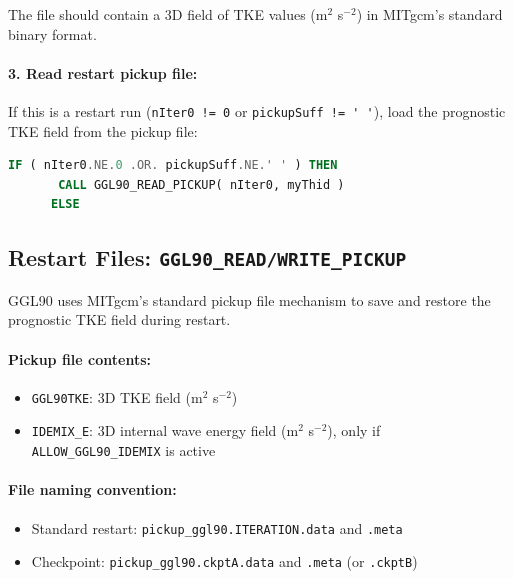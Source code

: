 \documentclass[12pt,letterpaper]{article}
\begin{document}
The file should contain a 3D field of TKE values (m$^2$ s$^{-2}$) in MITgcm's standard binary format.

\paragraph{3. Read restart pickup file:}

If this is a restart run (\verb|nIter0 != 0| or \verb|pickupSuff != ' '|), load the prognostic TKE field from the pickup file:

\begin{lstlisting}[language=Fortran,caption={(ggl90\_init\_varia.F:L131--133) Load from restart}]
      IF ( nIter0.NE.0 .OR. pickupSuff.NE.' ' ) THEN
       CALL GGL90_READ_PICKUP( nIter0, myThid )
      ELSE
\end{lstlisting}

\subsection{Restart Files: \texttt{GGL90\_READ/WRITE\_PICKUP}}
\label{sec:restart}

GGL90 uses MITgcm's standard pickup file mechanism to save and restore the prognostic TKE field during restart.

\paragraph{Pickup file contents:}
\begin{itemize}
\item \verb|GGL90TKE|: 3D TKE field (m$^2$ s$^{-2}$)
\item \verb|IDEMIX_E|: 3D internal wave energy field (m$^2$ s$^{-2}$), only if \verb|ALLOW_GGL90_IDEMIX| is active
\end{itemize}

\paragraph{File naming convention:}
\begin{itemize}
\item Standard restart: \verb|pickup_ggl90.ITERATION.data| and \verb|.meta|
\item Checkpoint: \verb|pickup_ggl90.ckptA.data| and \verb|.meta| (or \verb|.ckptB|)
\end{itemize}
\end{document}
